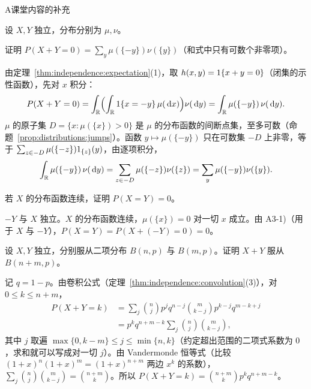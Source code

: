 \begin{exercises}{A}{课堂内容的补充}
\item\label{ex:independence:A3} 设 $X,Y$ 独立，分布分别为 $\mu,\nu$。
\begin{questions}
\item 证明 $P(X+Y=0)=\sum_y\mu(\{-y\})\nu(\{y\})$（和式中只有可数个非零项）。
\begin{solution}
由定理~\ref{thm:independence:expectation}(1)，取 $h(x,y)=1\{x+y=0\}$（闭集的示性函数），先对 $x$ 积分：
\[
P(X+Y=0)=\int_{\mathbb{R}}\Bigl(\int_{\mathbb{R}}1\{x=-y\}\,\mu(\,\mathrm{d} x)\Bigr)\nu(\,\mathrm{d} y)=\int_{\mathbb{R}}\mu(\{-y\})\,\nu(\,\mathrm{d} y).
\]
$\mu$ 的原子集 $D=\{x:\mu(\{x\})>0\}$ 是 $\mu$ 的分布函数的间断点集，至多可数（命题~\ref{prop:distributions:jumps}）。函数 $y\mapsto\mu(\{-y\})$ 只在可数集 $-D$ 上非零，等于 $\sum_{z\in-D}\mu(\{-z\})1_{\{z\}}(y)$，由逐项积分，
\[
\int_{\mathbb{R}}\mu(\{-y\})\,\nu(\,\mathrm{d} y)=\sum_{z\in-D}\mu(\{-z\})\nu(\{z\})=\sum_y\mu(\{-y\})\nu(\{y\}).
\]
\end{solution}
\item 若 $X$ 的分布函数连续，证明 $P(X=Y)=0$。
\begin{solution}
$-Y$ 与 $X$ 独立。$X$ 的分布函数连续，$\mu(\{x\})=0$ 对一切 $x$ 成立。由 A3-1)（用于 $X$ 与 $-Y$），$P(X=Y)=P(X+(-Y)=0)=0$。
\end{solution}
\end{questions}

\item\label{ex:independence:A4} 设 $X,Y$ 独立，分别服从二项分布 $B(n,p)$ 与 $B(m,p)$。证明 $X+Y$ 服从 $B(n+m,p)$。
\begin{solution}
记 $q=1-p$。由卷积公式（定理~\ref{thm:independence:convolution}(3)），对 $0\leqslant k\leqslant n+m$，
\[
\begin{aligned}
P(X+Y=k)&=\sum_j\binom njp^jq^{n-j}\binom m{k-j}p^{k-j}q^{m-k+j}\\
&=p^kq^{n+m-k}\sum_j\binom nj\binom m{k-j},
\end{aligned}
\]
其中 $j$ 取遍 $\max\{0,k-m\}\leqslant j\leqslant\min\{n,k\}$（约定超出范围的二项式系数为 $0$，求和就可以写成对一切 $j$）。由 Vandermonde 恒等式（比较 $(1+x)^n(1+x)^m=(1+x)^{n+m}$ 两边 $x^k$ 的系数），$\sum_j\binom nj\binom m{k-j}=\binom{n+m}k$。所以 $P(X+Y=k)=\binom{n+m}kp^kq^{n+m-k}$。
\end{solution}


\end{exercises}
